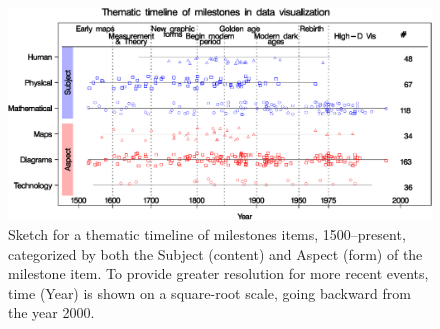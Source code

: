 \begin{figure}[!htb]
  \centering
  \includegraphics[width=\textwidth,clip]{fig/milecatline}
  \caption{Sketch for a thematic timeline of milestones items, 1500--present, categorized by both the Subject (content) and Aspect (form) of the milestone item.  To provide greater resolution for more recent events, time (Year) is shown on a square-root scale, going backward from the year 2000.}
  \label{fig:milecatline}
\end{figure}